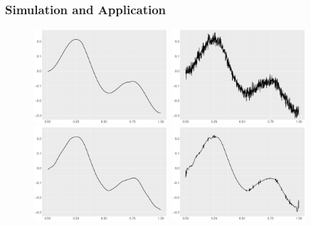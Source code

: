 \documentclass{beamer}
\begin{document}
\begin{frame}
\frametitle{Simulation and Application}
\begin{figure}
\centering
\includegraphics[width=5cm,height=3.5cm]{../Chapters/02TractorSplineTheory/plot/ggplot/ggHeaviSinePosition.pdf}
\includegraphics[width=5cm,height=3.5cm]{../Chapters/02TractorSplineTheory/plot/ggplot/ggHeaviSinePositionNoise}\\
\includegraphics[width=5cm,height=3.5cm]{../Chapters/02TractorSplineTheory/plot/ggplot/ggHeaviSinePSpline}
\includegraphics[width=5cm,height=3.5cm]{../Chapters/02TractorSplineTheory/plot/ggplot/ggHeaviSineSure}
\end{figure}
\end{frame}
\end{document}
